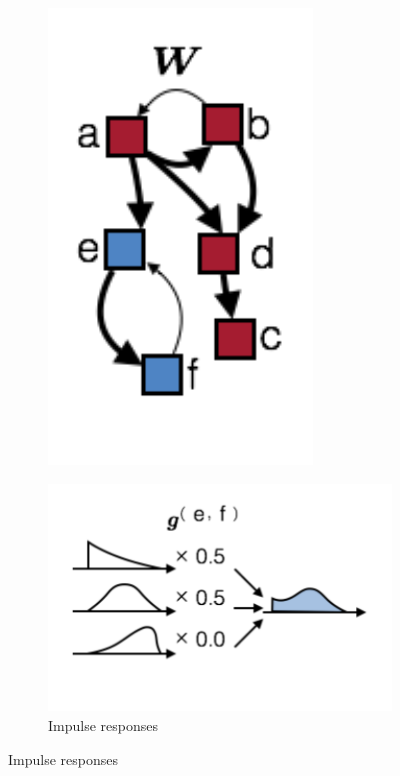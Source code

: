 \begin{figure}[t]
\begin{center}
\begin{subfigure}[b]{0.81in}
      \includegraphics[width=\textwidth]{figures/ch2b/figure1b.pdf} 
      \label{fig:hawkes_b}
    \end{subfigure}
    \begin{subfigure}[b]{2.10in}
      \caption{Impulse responses}
      \centering
      \includegraphics[width=\textwidth]{figures/ch2b/figure1c.pdf} 

\end{subfigure}
\end{center}
\end{figure}
